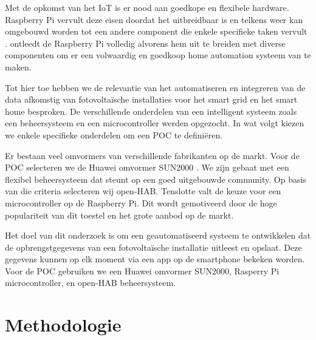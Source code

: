 \documentclass{hogent-article}
\begin{document}
    Met de opkomst van het IoT is er nood aan goedkope en flexibele hardware. Raspberry Pi vervult deze eisen doordat het uitbreidbaar is en telkens weer kan omgebouwd worden tot een andere component die enkele specifieke taken vervult \autocite{Maksimovic2014}. \textcite{Jain2021} ontleedt de Raspberry Pi volledig alvorens hem uit te breiden met diverse componenten om er een volwaardig en goedkoop home automation systeem van te maken.
    
    Tot hier toe hebben we de relevantie van het automatiseren en integreren van de data afkomstig van fotovoltaïsche installaties voor het smart grid en het smart home besproken. De verschillende onderdelen van een intelligent systeem zoals een beheersysteem en een microcontroller werden opgezocht. In wat volgt kiezen we enkele specifieke onderdelen om een POC te definiëren.
    
    Er bestaan veel omvormers van verschillende fabrikanten op de markt. Voor de POC selecteren we de Huawei omvormer SUN2000 \autocite{SUN2000L2022}. We zijn gebaat met een flexibel beheersysteem dat steunt op een goed uitgebouwde community. Op basis van die criteria selecteren wij open-HAB. Tenslotte valt de keuze voor een microcontroller op de Raspberry Pi. Dit wordt gemotiveerd door de hoge populariteit van dit toestel en het grote aanbod op de markt.
    
    Het doel van dit onderzoek is om een geautomatiseerd systeem te ontwikkelen dat de opbrengstgegevens van een fotovoltaïsche installatie uitleest en opslaat. Deze gegevens kunnen op elk moment via een app op de smartphone bekeken worden. Voor de POC gebruiken we een Huawei omvormer SUN2000, Rasperry Pi microcontroller, en open-HAB beheersysteem.
    
    \section{Methodologie}
    
    
\end{document}
